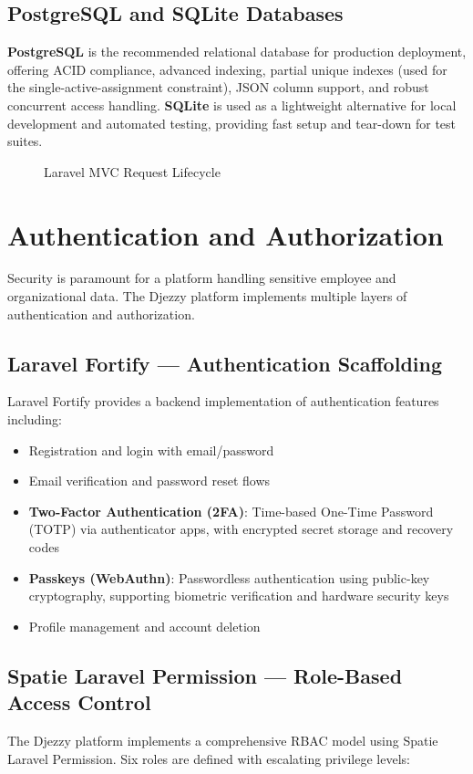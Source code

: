\documentclass{bts-report}
\begin{document}
\subsection{PostgreSQL and SQLite Databases}
\textbf{PostgreSQL} is the recommended relational database for production deployment, offering ACID compliance, advanced indexing, partial unique indexes (used for the single-active-assignment constraint), JSON column support, and robust concurrent access handling. \textbf{SQLite} is used as a lightweight alternative for local development and automated testing, providing fast setup and tear-down for test suites.

\begin{figure}[htbp]
  \centering
  \resizebox{\textwidth}{!}{}
  \caption{Laravel MVC Request Lifecycle}
  \label{fig:laravel-mvc}
\end{figure}

\section{Authentication and Authorization}

Security is paramount for a platform handling sensitive employee and organizational data. The Djezzy platform implements multiple layers of authentication and authorization.

\subsection{Laravel Fortify --- Authentication Scaffolding}
Laravel Fortify provides a backend implementation of authentication features including:
\begin{itemize}
  \item Registration and login with email/password
  \item Email verification and password reset flows
  \item \textbf{Two-Factor Authentication (2FA)}: Time-based One-Time Password (TOTP) via authenticator apps, with encrypted secret storage and recovery codes
  \item \textbf{Passkeys (WebAuthn)}: Passwordless authentication using public-key cryptography, supporting biometric verification and hardware security keys
  \item Profile management and account deletion
\end{itemize}

\subsection{Spatie Laravel Permission --- Role-Based Access Control}
The Djezzy platform implements a comprehensive RBAC model using Spatie Laravel Permission. Six roles are defined with escalating privilege levels:
\end{document}
